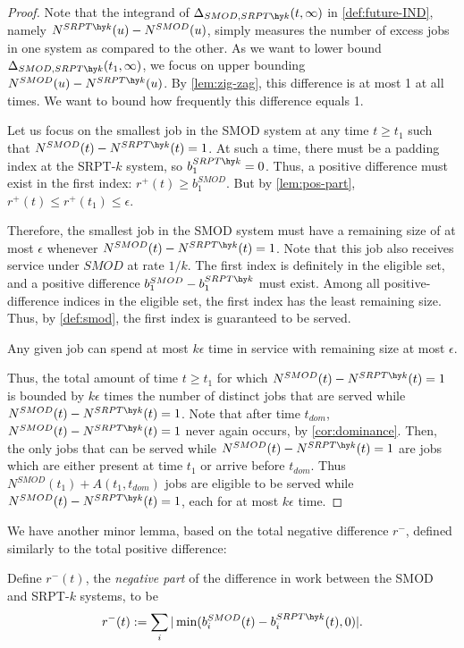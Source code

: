 \documentclass[acmsmall]{acmart}
\begin{document}
\begin{proof}
    Note that the integrand of $\Delta_{SMOD, SRPT\hy k}(t, \infty)$ in \cref{def:future-IND}, namely $N^{SRPT\hy k}(u) - N^{SMOD}(u)$,
    simply measures the number of excess jobs in one system as compared to the other.
    As we want to lower bound $\Delta_{SMOD, SRPT\hy k}(t_1, \infty)$,
    we focus on upper bounding $N^{SMOD}(u) - N^{SRPT\hy k}(u)$.
    By \cref{lem:zig-zag}, this difference is at most 1 at all times.
    We want to bound how frequently this difference equals 1.

    Let us focus on the smallest job in the SMOD system at any time $t \ge t_1$ such that $N^{SMOD}(t) - N^{SRPT\hy k}(t) = 1$.
    At such a time, there must be a padding index at the SRPT-$k$ system, so $b^{SRPT\hy k}_1 = 0$.
    Thus, a positive difference must exist in the first index: $r^+(t) \ge b^{SMOD}_1$.
    But by \cref{lem:pos-part}, $r^+(t) \le r^+(t_1) \le \epsilon$.

    Therefore, the smallest job in the SMOD system must have a remaining size of at most $\epsilon$
    whenever $N^{SMOD}(t) - N^{SRPT\hy k}(t) = 1$.
    Note that this job also receives service under $SMOD$ at rate $1/k$.
    The first index is definitely in the eligible set,
    and a positive difference $b^{SMOD}_1 - b^{SRPT\hy k}_1$ must exist.
    Among all positive-difference indices in the eligible set,
    the first index has the least remaining size.
    Thus, by \cref{def:smod}, the first index is guaranteed to be served.

    Any given job can spend at most $k \epsilon$ time in service with remaining size at most $\epsilon$.

    Thus, the total amount of time $t \ge t_1$ for which $N^{SMOD}(t) - N^{SRPT\hy k}(t) = 1$
    is bounded by $k \epsilon$ times the number of distinct jobs that are served while $N^{SMOD}(t) - N^{SRPT\hy k}(t) = 1$.
    Note that after time $t_{dom}$, $N^{SMOD}(t) - N^{SRPT\hy k}(t) = 1$ never again occurs, by \cref{cor:dominance}.
    Then, the only jobs that can be served while $N^{SMOD}(t) - N^{SRPT\hy k}(t) = 1$
    are jobs which are either present at time $t_1$ or arrive before $t_{dom}$. Thus $N^{SMOD}(t_1) + A(t_1, t_{dom})$ jobs are eligible to be served while $N^{SMOD}(t) - N^{SRPT\hy k}(t) = 1$,
    each for at most $k \epsilon$ time.
\end{proof}

We have another minor lemma,
based on the total negative difference $r^-$, defined similarly to the total positive difference:
\begin{definition}
    \label{def:negative-part}
    Define $r^-(t)$, the \textit{negative part} of the difference in work between the SMOD and SRPT-$k$ systems,
    to be
    \begin{align*}
        r^-(t) := \sum_{i} |\min(b_i^{SMOD}(t) - b_i^{SRPT\hy k}(t), 0)|.
    \end{align*}
\end{definition}
\end{document}
